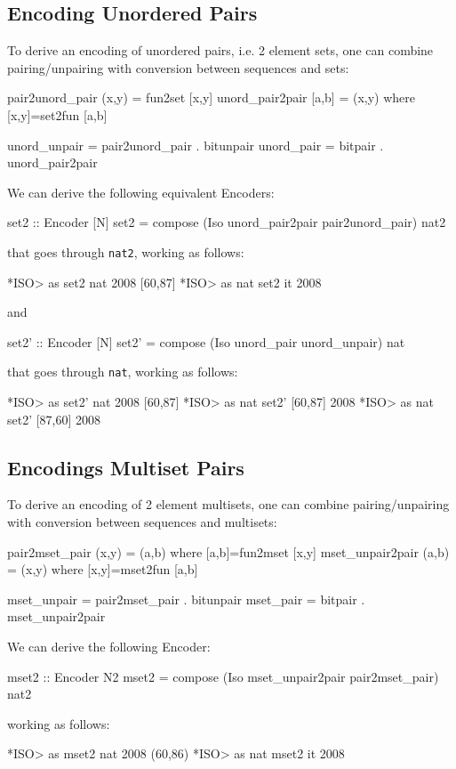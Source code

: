 \documentclass[]{INCLUDES/llncs}
\begin{document}
\subsection{Encoding Unordered Pairs}
To derive an encoding of unordered pairs, i.e. 2 element sets, one
can combine pairing/unpairing with conversion between sequences and
sets:
\begin{code}
pair2unord_pair (x,y) = fun2set [x,y]
unord_pair2pair [a,b] = (x,y) where 
  [x,y]=set2fun [a,b]   

unord_unpair = pair2unord_pair . bitunpair
unord_pair = bitpair . unord_pair2pair
\end{code}
We can derive the following equivalent Encoders:
\begin{code}
set2 :: Encoder [N]
set2 = compose (Iso unord_pair2pair pair2unord_pair) nat2
\end{code}
that goes through {\tt nat2}, working as follows:
\begin{codex}
*ISO> as set2 nat 2008
[60,87]
*ISO> as nat set2 it
2008
\end{codex}
and
\begin{code}
set2' :: Encoder [N]
set2' = compose (Iso unord_pair unord_unpair) nat
\end{code}
that goes through {\tt nat}, working as follows:
\begin{codex}
*ISO> as set2' nat 2008
[60,87]
*ISO> as nat set2' [60,87]
2008
*ISO> as nat set2' [87,60]
2008
\end{codex}

\subsection{Encodings Multiset Pairs}
To derive an encoding of 2 element multisets, one
can combine pairing/unpairing with conversion between sequences and
multisets:
\begin{code}
pair2mset_pair (x,y) = (a,b) where [a,b]=fun2mset [x,y]
mset_unpair2pair (a,b) = (x,y) where [x,y]=mset2fun [a,b]

mset_unpair = pair2mset_pair . bitunpair
mset_pair = bitpair . mset_unpair2pair
\end{code}
We can derive the following Encoder:
\begin{code}
mset2 :: Encoder N2
mset2 = compose (Iso mset_unpair2pair pair2mset_pair) nat2
\end{code}
working as follows:
\begin{codex}
*ISO> as mset2 nat 2008
(60,86)
*ISO> as nat mset2 it
2008
\end{codex}
\end{document}

